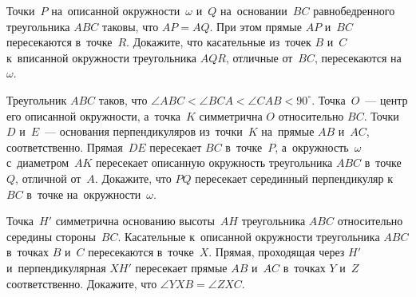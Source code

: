 \begin{problems}
\item
Точки~$P$ на~описанной окружности~$\omega$ и~$Q$ на~основании~$BC$
равнобедренного треугольника $ABC$ таковы, что $AP = AQ$.
При этом прямые $AP$ и~$BC$ пересекаются в~точке~$R$.
Докажите, что касательные из~точек $B$ и~$C$ к~вписанной окружности
треугольника $AQR$, отличные от~$BC$, пересекаются на~$\omega$.

\item
Треугольник $ABC$ таков, что
$\angle ABC < \angle BCA < \angle CAB < 90^{\circ}$.
Точка~$O$~--- центр его описанной окружности, а~точка~$K$ симметрична $O$
относительно $BC$.
Точки $D$ и~$E$~--- основания перпендикуляров из~точки~$K$
на~прямые $AB$ и~$AC$, соответственно.
Прямая~$DE$ пересекает $BC$ в~точке~$P$, а~окружность~$\omega$ с~диаметром~$AK$
пересекает описанную окружность треугольника $ABC$ в~точке~$Q$, отличной
от~$A$.
Докажите, что $PQ$ пересекает серединный перпендикуляр к~$BC$ в~точке
на~окружности~$\omega$.

\item
Точка~$H'$ симметрична основанию высоты~$AH$ треугольника $ABC$ относительно
середины стороны~$BC$.
Касательные к~описанной окружности треугольника $ABC$ в~точках $B$ и~$C$
пересекаются в~точке~$X$.
Прямая, проходящая через $H'$ и~перпендикулярная $XH'$ пересекает
прямые $AB$ и~$AC$ в~точках $Y$ и~$Z$ соответственно.
Докажите, что $\angle YXB = \angle ZXC$.

\end{problems}

